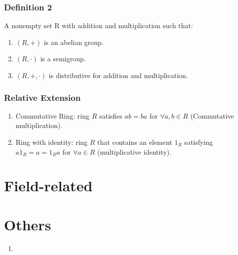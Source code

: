 \documentclass[letter]{article}
\begin{document}
\subsubsection{Definition 2}
A nonempty set R with addition and multiplication such that:\\
\begin{enumerate}
	\item $(R,+)$ is an abelian group.
	\item $(R,\cdot)$ is a semigroup.
	\item $(R,+,\cdot)$ is distributive for addition and multiplication.
\end{enumerate}
\subsubsection{Relative Extension}
\begin{enumerate}
	\item Commutative Ring: ring $R$ satisfies $ab=ba$ for $\forall a,b \in R$ (Commutative multiplication).
	\item Ring with identity: ring $R$ that contains an element $1_R$ satisfying $a1_R=a=1_Ra$ for $\forall a\in R$ (multiplicative identity).
\end{enumerate}
\section{Field-related}

\section{Others}
\begin{enumerate}
    \item 
\end{enumerate}
\end{document}
